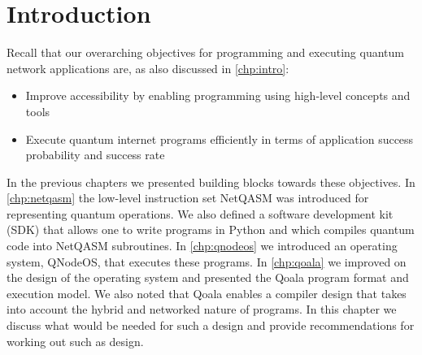 \section{Introduction}

Recall that our overarching objectives for programming and executing quantum network applications are, as also discussed in \cref{chp:intro}:
\begin{itemize}
\item Improve accessibility by enabling programming using high-level concepts and tools
\item Execute quantum internet programs efficiently in terms of application success probability and success rate
\end{itemize}

In the previous chapters we presented building blocks towards these objectives.
In \cref{chp:netqasm} the low-level instruction set NetQASM was introduced for representing quantum operations.
We also defined a software development kit (SDK) that allows one to write programs in Python and which compiles quantum code into NetQASM subroutines.
In \cref{chp:qnodeos} we introduced an operating system, QNodeOS, that executes these programs.
In \cref{chp:qoala} we improved on the design of the operating system and presented the Qoala program format and execution model.
We also noted that Qoala enables a compiler design that takes into account the hybrid and networked nature of programs.
In this chapter we discuss what would be needed for such a design and provide recommendations for working out such as design.

